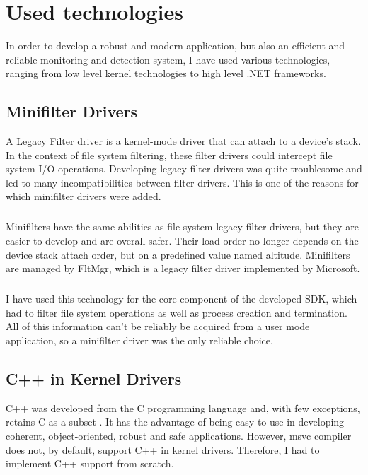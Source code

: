 \chapter{Used technologies}
    In order to develop a robust and modern application, but also an efficient and reliable monitoring and detection system, I have used various
    technologies, ranging from low level kernel technologies to high level .NET frameworks.

    \section{Minifilter Drivers}
        A Legacy Filter driver is a kernel-mode driver that can attach to a device's stack. In the context of file system filtering, these
        filter drivers could intercept file system I/O operations. Developing legacy filter drivers was quite troublesome and led to 
        many incompatibilities between filter drivers. This is one of the reasons for which minifilter drivers were added.
        
        \paragraph{}
        Minifilters have the same abilities as file system legacy filter drivers, but they are easier to develop and are overall safer. Their
        load order no longer depends on the device stack attach order, but on a predefined value named altitude. Minifilters are managed by
        FltMgr, which is a legacy filter driver implemented by Microsoft.

        \paragraph{}
        I have used this technology for the core component of the developed SDK, which had to filter file system operations as well
        as process creation and termination. All of this information can't be reliably be acquired from a user mode application, so a minifilter
        driver was the only reliable choice.

    \section{C++ in Kernel Drivers}
        C++ was developed from the C programming language and, with few exceptions, retains C as a subset \cite{TheCppProgrammingLanguage}. It
        has the advantage of being easy to use in developing coherent, object-oriented, robust and safe applications. However, msvc compiler
        does not, by default, support C++ in kernel drivers. Therefore, I had to implement C++ support from scratch.


